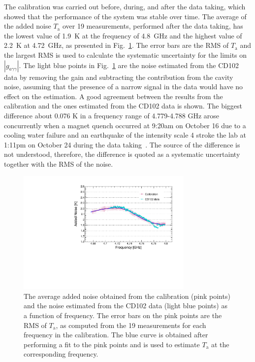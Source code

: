 \documentclass[%
reprint, %
superscriptaddress,
 amsmath,amssymb,
 aps
]{revtex4-2}
\begin{document}
The calibration was carried out before, during, and after the data taking, 
which showed that the performance of the system was stable over time. The 
average of the added noise $T_\text{a}$ over 19 measurements, performed after 
the data taking, has the lowest 
value of 1.9~K at the frequency of 4.8~GHz and the highest value of 
2.2~K at 4.72~GHz, as presented in Fig.~\ref{fig:hemtcalvsf}. 
The error bars are the RMS of $T_\text{a}$ and the largest RMS is used to 
calculate the systematic uncertainty for the limits on 
$\left|g_{a\gamma\gamma}\right|$. The light blue points in 
Fig.~\ref{fig:hemtcalvsf} are the noise estimated from the CD102 data by 
removing the gain and subtracting the contribution from the cavity noise, 
assuming 
that the presence of a narrow signal in the data would have no effect on the 
estimation. A good agreement between the results from the calibration  
and the ones estimated from the CD102 data is shown. %
The biggest difference about 0.076 K in a frequency range of 4.779-4.788 GHz arose concurrently when a magnet quench occurred at 9:20am on October 16 due to a cooling water failure and an earthquake of the intensity scale 4 stroke the lab at 1:11pm on October 24 during the data taking~\cite{TASEHInstrumentation}.
The source of the difference is not understood, 
therefore, the difference is quoted as a systematic uncertainty together 
with the RMS of the noise.

\begin{figure} [htbp]
  \centering
  \includegraphics[width=8.6cm]{Figure1.pdf}
  \caption{The average added noise obtained from the calibration (pink points)
 and the noise estimated from the CD102 data (light blue points) as a 
function of frequency. The error bars on the pink points are the RMS 
of $T_\text{a}$, as computed from the 19 measurements for each frequency 
in the calibration. 
The blue curve is obtained after performing a fit to 
the pink points and is used to estimate $T_\text{a}$ at the corresponding 
frequency.}
  \label{fig:hemtcalvsf}
\end{figure}
\end{document}
